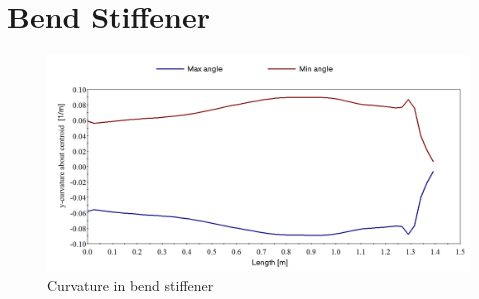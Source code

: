 \section{Bend Stiffener}
\begin{figure}[H]
\centering
\includegraphics[scale=0.4]{figures/bendstiff}
\caption[$\; \:$Curvature in bend stiffener]{Curvature in bend stiffener}
 \label{fig:bendstiff}
\end{figure}